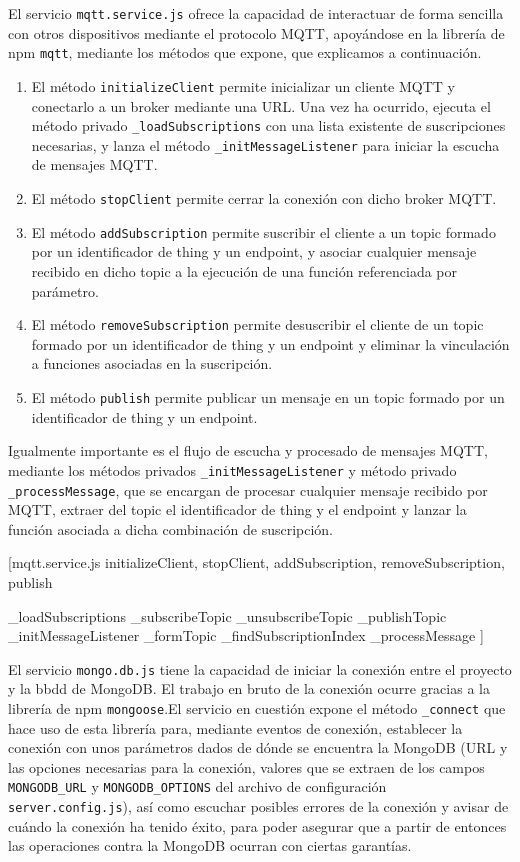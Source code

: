 El servicio \verb|mqtt.service.js| ofrece la capacidad de interactuar de forma sencilla con otros dispositivos mediante el protocolo MQTT, apoyándose en la librería de npm \verb|mqtt|, mediante los métodos que expone, que explicamos a continuación.
\begin{enumerate}
\item El método \verb|initializeClient| permite inicializar un cliente MQTT y conectarlo a un broker mediante una URL. Una vez ha ocurrido, ejecuta el método privado \verb|_loadSubscriptions| con una lista existente de suscripciones necesarias, y lanza el método \verb|_initMessageListener| para iniciar la escucha de mensajes MQTT.
\item El método \verb|stopClient| permite cerrar la conexión con dicho broker MQTT.
\item El método \verb|addSubscription| permite suscribir el cliente a un topic formado por un identificador de thing y un endpoint, y asociar cualquier mensaje recibido en dicho topic a la ejecución de una función referenciada por parámetro.
\item El método \verb|removeSubscription| permite desuscribir el cliente de un topic formado por un identificador de thing y un endpoint y eliminar la vinculación a funciones asociadas en la suscripción.
\item El método \verb|publish| permite publicar un mensaje en un topic formado por un identificador de thing y un endpoint.
\end{enumerate}
Igualmente importante es el flujo de escucha y procesado de mensajes MQTT, mediante los métodos privados \verb|_initMessageListener| y método privado \verb|_processMessage|, que se encargan de procesar cualquier mensaje recibido por MQTT, extraer del topic el identificador de thing y el endpoint y lanzar la función asociada a dicha combinación de suscripción.

[mqtt.service.js
  initializeClient,
  stopClient,
  addSubscription,
  removeSubscription,
  publish
  
  _loadSubscriptions
  _subscribeTopic
  _unsubscribeTopic
  _publishTopic
  _initMessageListener
  _formTopic
  _findSubscriptionIndex
  _processMessage
  ]
  
El servicio \verb|mongo.db.js| tiene la capacidad de iniciar la conexión entre el proyecto y la \gls{bbdd} de MongoDB. El trabajo en bruto de la conexión ocurre gracias a la librería de npm \verb|mongoose|.El servicio en cuestión expone el método \verb|_connect| que hace uso de esta librería para, mediante eventos de conexión, establecer la conexión con unos parámetros dados de dónde se encuentra la MongoDB (URL y las opciones necesarias para la conexión, valores que se extraen de los campos \verb|MONGODB_URL| y \verb|MONGODB_OPTIONS| del archivo de configuración \verb|server.config.js|), así como escuchar posibles errores de la conexión y avisar de cuándo la conexión ha tenido éxito, para poder asegurar que a partir de entonces las operaciones contra la MongoDB ocurran con ciertas garantías.

